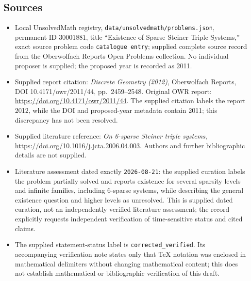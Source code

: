 \documentclass[11pt]{article}
\begin{document}
\subsection{Sources}
\begin{itemize}
\item Local UnsolvedMath registry, \texttt{data/unsolvedmath/problems.json}, permanent ID \(30001881\), title ``Existence of Sparse Steiner Triple Systems,'' exact source problem code \texttt{catalogue entry}; supplied complete source record from the Oberwolfach Reports Open Problems collection. No individual proposer is supplied; the proposed year is recorded as 2011.
\item Supplied report citation: \emph{Discrete Geometry (2012)}, Oberwolfach Reports, DOI 10.4171/owr/2011/44, pp.~2459--2548. Original OWR report: \url{https://doi.org/10.4171/owr/2011/44}. The supplied citation labels the report 2012, while the DOI and proposed-year metadata contain 2011; this discrepancy has not been resolved.
\item Supplied literature reference: \emph{On 6-sparse Steiner triple systems}, \url{https://doi.org/10.1016/j.jcta.2006.04.003}. Authors and further bibliographic details are not supplied.
\item Literature assessment dated exactly \texttt{2026-08-21}: the supplied curation labels the problem partially solved and reports existence for several sparsity levels and infinite families, including 6-sparse systems, while describing the general existence question and higher levels as unresolved. This is supplied dated curation, not an independently verified literature assessment; the record explicitly requests independent verification of time-sensitive status and cited claims.
\item The supplied statement-status label is \texttt{corrected\_verified}. Its accompanying verification note states only that TeX notation was enclosed in mathematical delimiters without changing mathematical content; this does not establish mathematical or bibliographic verification of this draft.
\end{itemize}
\end{document}
